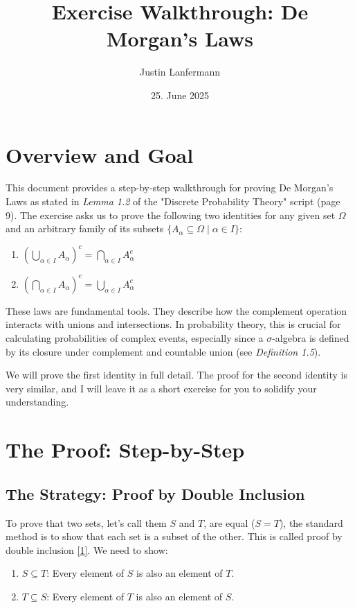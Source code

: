 \documentclass[11pt,a4paper]{article}
\title{Exercise Walkthrough: De Morgan's Laws}
\author{Justin Lanfermann}
\date{25. June 2025}
\begin{document}
\maketitle

\section{Overview and Goal}

This document provides a step-by-step walkthrough for proving De Morgan's Laws as stated in \textit{Lemma 1.2} of the "Discrete Probability Theory" script (page 9). The exercise asks us to prove the following two identities for any given set $\Omega$ and an arbitrary family of its subsets $\{A_\alpha \subseteq \Omega \mid \alpha \in I\}$:
\begin{enumerate}
    \item $\left( \bigcup_{\alpha \in I} A_\alpha \right)^c = \bigcap_{\alpha \in I} A_\alpha^c$
    \item $\left( \bigcap_{\alpha \in I} A_\alpha \right)^c = \bigcup_{\alpha \in I} A_\alpha^c$
\end{enumerate}

These laws are fundamental tools. They describe how the complement operation interacts with unions and intersections. In probability theory, this is crucial for calculating probabilities of complex events, especially since a $\sigma$-algebra is defined by its closure under complement and countable union (see \textit{Definition 1.5}).

We will prove the first identity in full detail. The proof for the second identity is very similar, and I will leave it as a short exercise for you to solidify your understanding.

\section{The Proof: Step-by-Step}

\subsection{The Strategy: Proof by Double Inclusion}

To prove that two sets, let's call them $S$ and $T$, are equal ($S=T$), the standard method is to show that each set is a subset of the other. This is called proof by double inclusion \hyperlink{ref1}{[1]}.
We need to show:
\begin{enumerate}
    \item $S \subseteq T$: Every element of $S$ is also an element of $T$.
    \item $T \subseteq S$: Every element of $T$ is also an element of $S$.
\end{enumerate}
\end{document}
